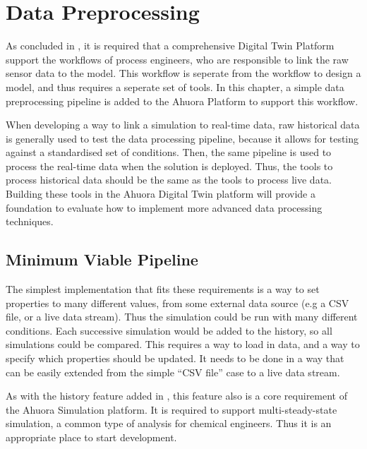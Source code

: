 \chapter{Data Preprocessing} \label{sec:datapreprocessing}



As concluded in , it is required that a comprehensive Digital Twin Platform support the workflows of process engineers, who are responsible to link the raw sensor data to the model. This workflow is seperate from the workflow to design a model, and thus requires a seperate set of tools. 
In this chapter, a simple data preprocessing pipeline is added to the Ahuora Platform to support this workflow. 

When developing a way to link a simulation to real-time data, raw historical data is generally used to test the data processing pipeline, because it allows for testing against a standardised set of conditions. Then, the same pipeline is used to process the real-time data when the solution is deployed.
Thus, the tools to process historical data should be the same as the tools to process live data. 
Building these tools in the Ahuora Digital Twin platform will provide a foundation to evaluate how to implement more advanced data processing techniques.

\section{Minimum Viable Pipeline}

The simplest implementation that fits these requirements is a way to set properties to many different values, from some external data source (e.g a CSV file, or a live data stream). Thus the simulation could be run with many different conditions. Each successive simulation would be added to the history, so all simulations could be compared.
This requires a way to load in data, and a way to specify which properties should be updated. It needs to be done in a way that can be easily extended from the simple ``CSV file'' case to a live data stream.

As with the history feature added in , this feature also is a core requirement of the Ahuora Simulation platform. It is required to support multi-steady-state simulation, a common type of analysis for chemical engineers. Thus it is an appropriate place to start development. 

